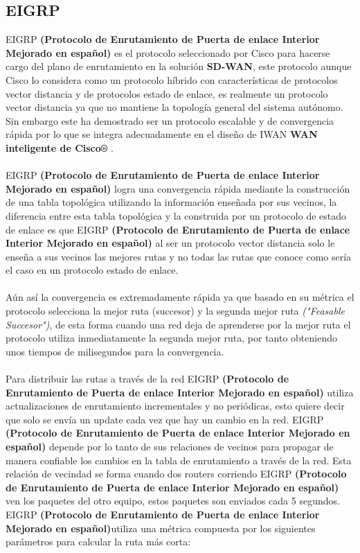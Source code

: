 \subsection{EIGRP}
\label{sec:EIGRP}

EIGRP \textbf{(Protocolo de Enrutamiento de Puerta de enlace Interior Mejorado en español)} es el protocolo seleccionado por Cisco para hacerse cargo del plano de enrutamiento en la solución \textbf{SD-WAN}, este protocolo aunque Cisco lo considera como un protocolo híbrido con características de protocolos vector distancia y de protocolos estado de enlace, es realmente un protocolo vector distancia ya que no mantiene la topología general del sistema autónomo. Sin embargo este ha demostrado ser un protocolo escalable y de convergencia rápida por lo que se integra adecuadamente en el diseño de IWAN \textbf{WAN inteligente de Cisco®} .
\\
\\
EIGRP \textbf{(Protocolo de Enrutamiento de Puerta de enlace Interior Mejorado en español)} logra una convergencia rápida mediante la construcción de una tabla topológica utilizando la información enseñada por sus vecinos, la diferencia entre esta tabla topológica y la construida por un protocolo de estado de enlace es que  EIGRP \textbf{(Protocolo de Enrutamiento de Puerta de enlace Interior Mejorado en español)} al ser un protocolo vector distancia solo le enseña a sus vecinos las mejores rutas y no todas las rutas que conoce como sería el caso en un protocolo estado de enlace. 
\\
\\
Aún así la convergencia es extremadamente rápida ya que basado en su métrica el protocolo selecciona la mejor ruta (succesor) y la segunda mejor ruta \textit{("Feasable Succesor")}, de esta forma cuando una red deja de aprenderse por la mejor ruta el protocolo utiliza inmediatamente la segunda mejor ruta, por tanto obteniendo unos tiempos de milisegundos para la convergencia.
\\
\\
Para distribuir las rutas a través de la red EIGRP \textbf{(Protocolo de Enrutamiento de Puerta de enlace Interior Mejorado en español)} utiliza actualizaciones de enrutamiento incrementales y no periódicas, esto quiere decir que solo se envía un update cada vez que hay un cambio en la red. EIGRP \textbf{(Protocolo de Enrutamiento de Puerta de enlace Interior Mejorado en español)} depende por lo tanto de sus relaciones de vecinos para propagar de manera confiable los cambios en la tabla de enrutamiento a través de la red. Esta relación de vecindad se forma cuando dos routers corriendo EIGRP \textbf{(Protocolo de Enrutamiento de Puerta de enlace Interior Mejorado en español)} ven los paquetes del otro equipo, estos paquetes son enviados cada 5 segundos.
EIGRP \textbf{(Protocolo de Enrutamiento de Puerta de enlace Interior Mejorado en español)}utiliza una métrica compuesta por los siguientes parámetros para calcular la ruta más corta:

